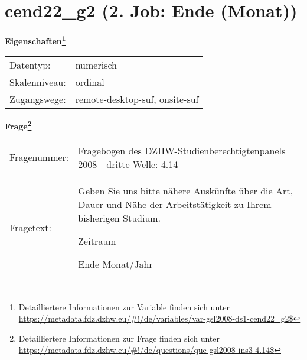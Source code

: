 
    \setcounter{footnote}{0}

    \vspace*{-1.8cm}
	\section{cend22\_g2 (2. Job: Ende (Monat))}
	\label{section:cend22_g2}



    \vspace*{0.5cm}
    \noindent\textbf{Eigenschaften\footnote{Detailliertere Informationen zur Variable finden sich unter
		\url{https://metadata.fdz.dzhw.eu/\#!/de/variables/var-gsl2008-ds1-cend22_g2$}}}\\
	\begin{tabularx}{\hsize}{@{}lX}
	Datentyp: & numerisch \\
	Skalenniveau: & ordinal \\
	Zugangswege: &
	  remote-desktop-suf, 
	  onsite-suf
 \\
    \end{tabularx}



				\vspace*{0.5cm}
                \noindent\textbf{Frage\footnote{Detailliertere Informationen zur Frage finden sich unter
		              \url{https://metadata.fdz.dzhw.eu/\#!/de/questions/que-gsl2008-ins3-4.14$}}}\\
				\begin{tabularx}{\hsize}{@{}lX}
					Fragenummer: &
					  Fragebogen des DZHW-Studienberechtigtenpanels 2008 - dritte Welle:
					  4.14
 \\
					Fragetext: & Geben Sie uns bitte nähere Auskünfte über die Art, Dauer und Nähe der Arbeitstätigkeit zu Ihrem bisherigen Studium.\par  Zeitraum\par  Ende Monat/Jahr \\
				\end{tabularx}





